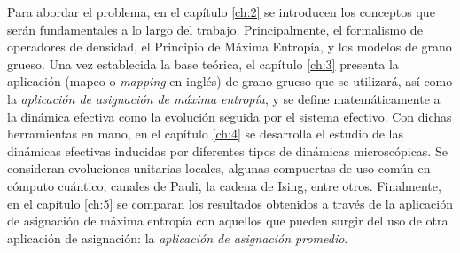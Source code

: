 Para abordar el problema, en el capítulo \ref{ch:2} se introducen los conceptos que serán fundamentales a lo largo del trabajo. Principalmente, el formalismo de operadores de densidad, el Principio de Máxima Entropía, y los modelos de grano grueso. Una vez establecida la base teórica, el capítulo \ref{ch:3} presenta la aplicación (mapeo o \textit{mapping} en inglés) de grano grueso que se utilizará, así como la \textit{aplicación de asignación de máxima entropía}, y se define matemáticamente a la dinámica efectiva como la evolución seguida por el sistema efectivo. Con dichas herramientas en mano, en el capítulo \ref{ch:4} se desarrolla el estudio de las dinámicas efectivas inducidas por diferentes tipos de dinámicas microscópicas. Se consideran evoluciones unitarias locales, algunas compuertas de uso común en cómputo cuántico, canales de Pauli, la cadena de Ising, entre otros. Finalmente, en el capítulo \ref{ch:5} se comparan los resultados obtenidos a través de la aplicación de asignación de máxima entropía con aquellos que pueden surgir del uso de otra aplicación de asignación: la \textit{aplicación de asignación promedio}.